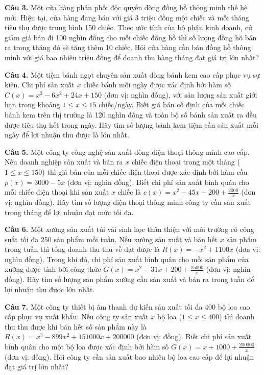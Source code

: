\documentclass[12pt]{article}
\begin{document}
	\vspace{0.6cm}
	\noindent \textbf{Câu 3.} Một cửa hàng phân phối độc quyền dòng đồng hồ thông minh thế hệ mới. Hiện tại, cửa hàng đang bán với giá 3 triệu đồng một chiếc và mỗi tháng tiêu thụ được trung bình 150 chiếc. Theo ước tính của bộ phận kinh doanh, cứ giảm giá bán đi 100 nghìn đồng cho mỗi chiếc đồng hồ thì số lượng đồng hồ bán ra trong tháng đó sẽ tăng thêm 10 chiếc. Hỏi cửa hàng cần bán đồng hồ thông minh với giá bao nhiêu triệu đồng để doanh thu hàng tháng đạt giá trị lớn nhất?
	
	\vspace{0.6cm}
	\noindent \textbf{Câu 4.} Một tiệm bánh ngọt chuyên sản xuất dòng bánh kem cao cấp phục vụ sự kiện. Chi phí sản xuất $x$ chiếc bánh mỗi ngày được xác định bởi hàm số $C(x) = x^3 - 6x^2 + 24x + 150$ (đơn vị: nghìn đồng), với sản lượng sản xuất giới hạn trong khoảng $1 \le x \le 15$ chiếc/ngày. Biết giá bán cố định của mỗi chiếc bánh kem trên thị trường là 120 nghìn đồng và toàn bộ số bánh sản xuất ra đều được tiêu thụ hết trong ngày. Hãy tìm số lượng bánh kem tiệm cần sản xuất mỗi ngày để lợi nhuận thu được là lớn nhất.
	
	\vspace{0.6cm}
	\noindent \textbf{Câu 5.} Một công ty công nghệ sản xuất dòng điện thoại thông minh cao cấp. Nếu doanh nghiệp sản xuất và bán ra $x$ chiếc điện thoại trong một tháng ($1 \le x \le 150$) thì giá bán của mỗi chiếc điện thoại được xác định bởi hàm cầu $p(x) = 3000 - 5x$ (đơn vị: nghìn đồng). Biết chi phí sản xuất bình quân cho mỗi chiếc điện thoại khi sản xuất $x$ chiếc là $c(x) = x^2 - 45x + 200 + \frac{2000}{x}$ (đơn vị: nghìn đồng). Hãy tìm số lượng điện thoại thông minh công ty cần sản xuất trong tháng để lợi nhuận đạt mức tối đa.
	
	\vspace{0.6cm}
	\noindent \textbf{Câu 6.} Một xưởng sản xuất túi vải sinh học thân thiện với môi trường có công suất tối đa 250 sản phẩm mỗi tuần. Nếu xưởng sản xuất và bán hết $x$ sản phẩm trong tuần thì tổng doanh thu thu về đạt được là $R(x) = -x^2 + 1100x$ (đơn vị: nghìn đồng). Trong khi đó, chi phí sản xuất bình quân cho mỗi sản phẩm của xưởng được tính bởi công thức $G(x) = x^2 - 31x + 200 + \frac{15000}{x}$ (đơn vị: nghìn đồng). Hãy tìm số lượng sản phẩm xưởng cần sản xuất và bán ra trong tuần để lợi nhuận thu được lớn nhất.
	
	\vspace{0.6cm}
	\noindent \textbf{Câu 7.} Một công ty thiết bị âm thanh dự kiến sản xuất tối đa 400 bộ loa cao cấp phục vụ xuất khẩu. Nếu công ty sản xuất $x$ bộ loa ($1 \le x \le 400$) thì doanh thu thu được khi bán hết số sản phẩm này là $R(x) = x^3 - 899x^2 + 151000x + 200000$ (đơn vị: đồng). Biết chi phí sản xuất bình quân cho một bộ loa được xác định bởi hàm số $G(x) = x + 1000 + \frac{200000}{x}$ (đơn vị: đồng). Hỏi công ty cần sản xuất bao nhiêu bộ loa cao cấp để lợi nhuận đạt giá trị lớn nhất?
	
\end{document}
